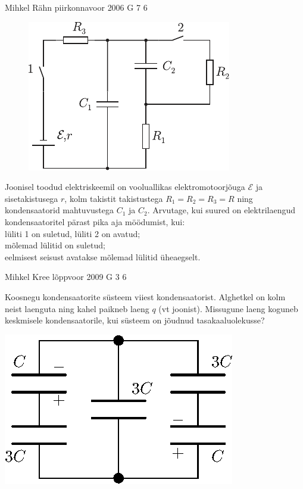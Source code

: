 \documentclass[11pt, twoside]{article}
\begin{document}
{%
{Mihkel Rähn} %
{piirkonnavoor} %
{2006} %
{G 7} %
{6} %
{
\ifStatement
\begin{figure}
	\begin{center}
		\vspace{-25pt}
		\includegraphics[width=\linewidth]{2006-v2g-07-yl}
	\end{center}
\end{figure}
Joonisel toodud elektriskeemil on vooluallikas elektromotoorjõuga $\mathcal E$ ja sisetakistusega $r$, kolm takistit takistustega $R_1 = R_2 = R_3 = R$ ning kondensaatorid mahtuvustega $C_1$ ja $C_2$. Arvutage, kui suured on elektrilaengud kondensaatoritel pärast pika aja möödumist, kui:\\
\osa lüliti 1 on suletud, lüliti 2 on avatud;\\
\osa mõlemad lülitid on suletud;\\
\osa eelmisest seisust avatakse mõlemad lülitid üheaegselt. 
\fi
}

{Mihkel Kree} %
{lõppvoor} %
{2009} %
{G 3} %
{6} %
{
\ifStatement
Koosnegu kondensaatorite süsteem viiest kondensaatorist. Alghetkel on kolm neist laenguta ning kahel paikneb laeng $q$ (vt joonist). Missugune laeng koguneb keskmisele kondensaatorile, kui süsteem on jõudnud tasakaaluolekusse?

\begin{center}
	\includegraphics[width=0.42\linewidth]{2009-v3g-03-G_kondensaatorid.eps}
\end{center}
\fi
}

}
\end{document}
